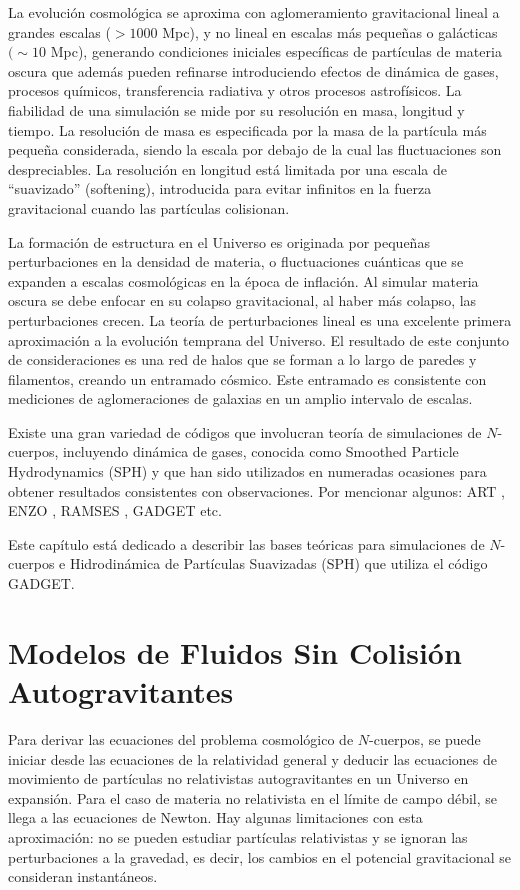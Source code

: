 \documentclass[a4paper,openright,12pt]{book}
\begin{document}
La evolución cosmológica se aproxima con aglomeramiento gravitacional lineal a grandes escalas ($>1000$ Mpc), y no lineal en escalas más pequeñas o galácticas $(\sim 10$ Mpc), generando condiciones iniciales específicas de partículas de materia oscura que además pueden refinarse introduciendo efectos de dinámica de gases, procesos químicos, transferencia radiativa y otros procesos astrofísicos. La fiabilidad de una simulación se mide por su resolución en masa, longitud y tiempo. La resolución de masa es especificada por la masa de la partícula más pequeña considerada, siendo la escala por debajo de la cual las fluctuaciones son despreciables. La resolución en longitud está limitada por una escala de ``suavizado'' (softening), introducida para evitar infinitos en la fuerza gravitacional cuando las partículas colisionan.

La formación de estructura en el Universo es originada por pequeñas perturbaciones en la densidad de materia, o fluctuaciones cuánticas que se expanden a escalas cosmológicas en la época de inflación. Al simular materia oscura se debe enfocar en su colapso gravitacional, al haber más colapso, las perturbaciones crecen. La teoría de perturbaciones lineal es una excelente primera aproximación a la evolución temprana del Universo. El resultado de este conjunto de consideraciones es una red de halos que se forman a lo largo de paredes y filamentos, creando un entramado cósmico. Este entramado es consistente con mediciones de aglomeraciones de galaxias en un amplio intervalo de escalas.

Existe una gran variedad de códigos que involucran teoría de simulaciones de $N$-cuerpos, incluyendo dinámica de gases, conocida como Smoothed Particle Hydrodynamics (SPH) y que han sido utilizados en numeradas ocasiones para obtener resultados consistentes con observaciones. Por mencionar algunos: ART \cite{2.1.1}, ENZO \cite{2.1.2}, RAMSES \cite{2.1.3}, GADGET \cite{b4} etc.

Este capítulo está dedicado a describir las bases teóricas para simulaciones de $N$-cuerpos e Hidrodinámica de Partículas Suavizadas (SPH) que utiliza el código GADGET.

\section{Modelos de Fluidos Sin Colisión Autogravitantes}
Para derivar las ecuaciones del problema cosmológico de $N$-cuerpos, se puede iniciar desde las ecuaciones de la relatividad general y deducir las ecuaciones de movimiento de partículas no relativistas autogravitantes en un Universo en expansión. Para el caso de materia no relativista en el límite de campo débil, se llega a las ecuaciones de Newton. Hay algunas limitaciones con esta aproximación: no se pueden estudiar partículas relativistas y se ignoran las perturbaciones a la gravedad, es decir, los cambios en el potencial gravitacional se consideran instantáneos.
\end{document}
